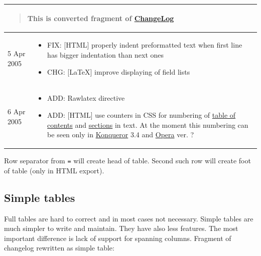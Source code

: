 \documentclass[12pt]{article}
\begin{document}
\setlongtables
\begin{center}
\begin{longtable}[c]{p{} p{} }
\multicolumn{2}{p{0.89\textwidth}}{\begin{quotation}
 This is converted fragment of \href{\#lchangelog}{ChangeLog}
 \end{quotation}}
 \\ 
\endhead

5 Apr 2005
&
\begin{itemize}
\item
FIX: [HTML] properly indent preformatted 
text when first line has bigger 
indentation than next ones

\item
CHG: [\LaTeX{}] improve displaying 
of field lists
\end{itemize}

 \\ 

6 Apr 2005
&
\begin{itemize}
\item
ADD: Rawlatex directive

\item
ADD: [HTML] use counters in CSS for 
numbering of \href{\#ltable-of-contents}{table of contents} 
and \href{\#lsections}{sections} in text. At the moment 
this numbering can be seen only in 
\href{http://www.kde.org}{Konqueror} 3.4 and \href{http://www.opera.com}{Opera} ver. ?
\end{itemize}

 \\ \end{longtable}
\end{center}

Row separator from \texttt{=} will create head of table. Second such row will
create foot of table (only in HTML export).

\hypertarget{lsimple-tables}{}
\subsection{Simple tables}

Full tables are hard to correct and in most cases not necessary. Simple tables
are much simpler to write and maintain. They have also less features. The most
important difference is lack of support for spanning columns. Fragment of
changelog rewritten as simple table:
\end{document}
